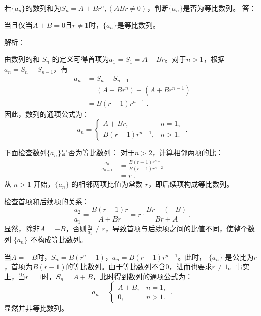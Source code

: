 \begin{example}{若$\{a_n\}$的数列和为$S_n=A+Br^n,(ABr\neq0)$，判断$\{a_n\}$是否为等比数列。}
答：

当且仅当$A+B=0$且$r\neq1$时，$\{a_n\}$是等比数列。

解析：

由数列的和 $S_n$ 的定义可得首项为$a_1=S_1=A+Br$。对于$n>1$，根据 $a_n = S_n - S_{n-1}$，有
\begin{equation}
\begin{aligned}
a_n &= S_n - S_{n-1} \\
&= (A + Br^n) - (A + Br^{n-1}) \\
&= B(r - 1)r^{n-1}~.
\end{aligned}
\end{equation}
因此，数列的通项公式为：
\begin{equation}
a_n =
\begin{cases}
A + Br, & n = 1, \\
B(r - 1)r^{n-1}, & n > 1.
\end{cases}~.
\end{equation}

下面检查数列$\{a_n\}$是否为等比数列：
对于$ n > 2$，计算相邻两项的比：
\begin{equation}
\begin{aligned}
\frac{a_n}{a_{n-1}} &= \frac{B(r-1)r^{n-1}}{B(r-1)r^{n-2}} \\
&= r~.
\end{aligned}
\end{equation}
从 $n > 1$ 开始，$\{a_n\}$ 的相邻两项比值为常数 $r$，即后续项构成等比数列。

检查首项和后续项的关系：
\begin{equation}
\frac{a_2}{a_1} = \frac{B(r-1)r}{A+Br}=r\cdot\frac{Br+(-B)}{Br+A}~.
\end{equation}
显然，除非$A=-B$，否则$\displaystyle\frac{a_2}{a_1} \neq r$，导致首项与后续项之间的比值不同，使整个数列 $\{a_n\}$ 不构成等比数列。

当$A=-B$时，$S_n=B(r^n-1)$，$a_n=B(r - 1)r^{n-1}$。此时， $\{a_n\}$ 是公比为$r$，首项为$B(r-1)$的等比数列。由于等比数列不含$0$，进而也要求$r\neq1$。事实上，当$r=1$时，$S_n=A+B$，此时得到数列的通项公式为：
\begin{equation}
a_n =
\begin{cases}
A + B, & n = 1, \\
0, & n > 1.
\end{cases}~.
\end{equation}
显然并非等比数列。
\end{example}

